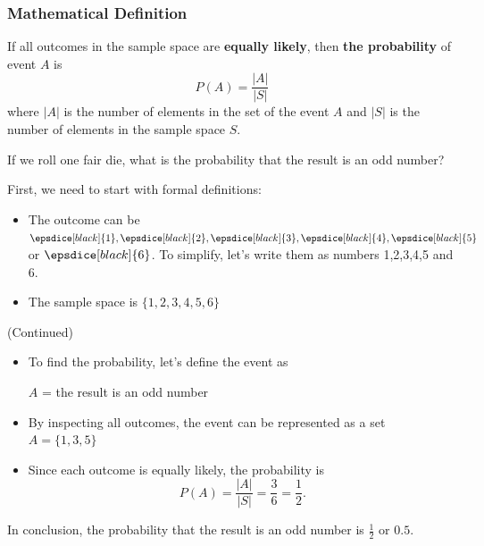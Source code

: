 \begin{frame}
\frametitle{Mathematical Definition}
\begin{defn}{}{}
If all outcomes in the sample space are \textbf{equally likely}, then \textbf{the probability} of event $A$ is 
\begin{equation}
P(A) = \frac{|A|}{|S|}
\end{equation}
where $|A|$ is the number of elements in the set of the event $A$ and $|S|$ is the number of elements in the sample space $S$. \pause
\end{defn}
\end{frame}


\begin{frame}[t]
\begin{ex}
If we roll one fair die, what is the probability that the result is an odd number?
\end{ex}
\begin{sol}
First, we need to start with formal definitions:
\begin{itemize}
\item The outcome can be $\epsdice[black]{1}, \epsdice[black]{2}, \epsdice[black]{3}, \epsdice[black]{4}, \epsdice[black]{5}$ or $\epsdice[black]{6}$. To simplify, let's write them as numbers 1,2,3,4,5 and 6.
\item The sample space is $\{1,2,3,4,5,6\}$
\end{itemize}
\end{sol}
\end{frame}

\begin{frame}
\begin{sol} (Continued)
\begin{itemize}
\item To find the probability, let's define the event as
\begin{center}
$A$ = the result is an odd number
\end{center}
\item By inspecting all outcomes, the event can be represented as a set $A = \{1,3,5\}$
\item Since each outcome is equally likely, the probability is
\[P(A) = \frac{|A|}{|S|} = \frac{3}{6} = \frac{1}{2}.\]
\end{itemize}
In conclusion, the probability that the result is an odd number is $\frac{1}{2}$ or $0.5$.
\end{sol}
\end{frame}

